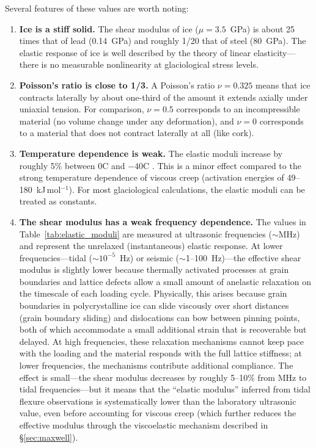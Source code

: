 \documentclass[11pt]{article}
\begin{document}
\noindent Several features of these values are worth noting:
\begin{enumerate}
  \item \textbf{Ice is a stiff solid.}  The shear modulus of ice ($\mu = 3.5$~GPa) is about 25 times that of lead (0.14~GPa) and roughly 1/20 that of steel (80~GPa).  The elastic response of ice is well described by the theory of linear elasticity---there is no measurable nonlinearity at glaciological stress levels.

  \item \textbf{Poisson's ratio is close to 1/3.}  A Poisson's ratio $\nu = 0.325$ means that ice contracts laterally by about one-third of the amount it extends axially under uniaxial tension.  For comparison, $\nu = 0.5$ corresponds to an incompressible material (no volume change under any deformation), and $\nu = 0$ corresponds to a material that does not contract laterally at all (like cork).

  \item \textbf{Temperature dependence is weak.}  The elastic moduli increase by roughly 5\% between 0\textdegree C and $-40$\textdegree C \cite{Gammonetal1983}.  This is a minor effect compared to the strong temperature dependence of viscous creep (activation energies of 49--180~kJ\,mol$^{-1}$).  For most glaciological calculations, the elastic moduli can be treated as constants.

  \item \textbf{The shear modulus has a weak frequency dependence.}  The values in Table~\ref{tab:elastic_moduli} are measured at ultrasonic frequencies ($\sim$MHz) and represent the unrelaxed (instantaneous) elastic response.  At lower frequencies---tidal ($\sim 10^{-5}$~Hz) or seismic ($\sim$1--100~Hz)---the effective shear modulus is slightly lower because thermally activated processes at grain boundaries and lattice defects allow a small amount of anelastic relaxation on the timescale of each loading cycle.  Physically, this arises because grain boundaries in polycrystalline ice can slide viscously over short distances (grain boundary sliding) and dislocations can bow between pinning points, both of which accommodate a small additional strain that is recoverable but delayed.  At high frequencies, these relaxation mechanisms cannot keep pace with the loading and the material responds with the full lattice stiffness; at lower frequencies, the mechanisms contribute additional compliance.  The effect is small---the shear modulus decreases by roughly 5--10\% from MHz to tidal frequencies---but it means that the ``elastic modulus'' inferred from tidal flexure observations is systematically lower than the laboratory ultrasonic value, even before accounting for viscous creep (which further reduces the effective modulus through the viscoelastic mechanism described in \S\ref{sec:maxwell}).
\end{enumerate}
\end{document}
